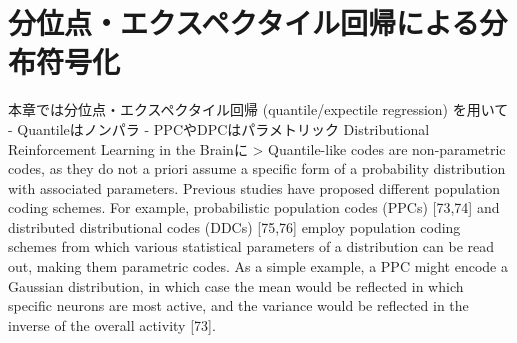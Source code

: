 \section{分位点・エクスペクタイル回帰による分布符号化}本章では分位点・エクスペクタイル回帰 (quantile/expectile regression) を用いて
- Quantileはノンパラ
- PPCやDPCはパラメトリック
Distributional Reinforcement Learning in the Brainに
> Quantile-like codes are non-parametric codes, as they do not a priori assume a specific form of a probability distribution with associated parameters. Previous studies have proposed different population coding schemes. For example, probabilistic population codes (PPCs) [73,74] and distributed distributional codes (DDCs) [75,76] employ population coding schemes from which various statistical parameters of a distribution can be read out, making them parametric codes. As a simple example, a PPC might encode a Gaussian distribution, in which case the mean would be reflected in which specific neurons are most active, and the variance would be reflected in the inverse of the overall activity [73].